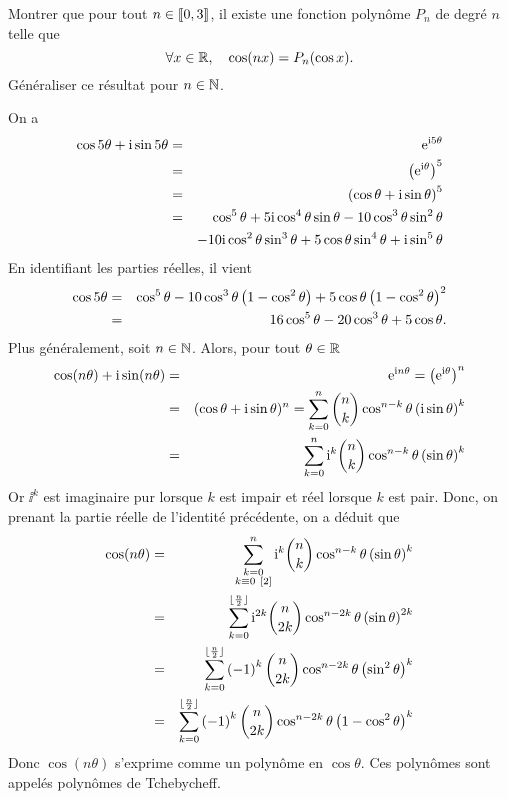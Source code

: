 \documentclass{magnolia}
\begin{document}
\begin{exoUnique}
\exo
  \begin{questions}
  \question Montrer que pour tout $n\in\left\llbracket 0,3\right\rrbracket$, il existe une fonction
    polynôme $P_n$ de degré $n$ telle que
    \[\forall x\in\mathbb{R},\quad \cos(nx)=P_n(\cos x).\]
  \question Généraliser ce résultat pour $n\in\mathbb{N}$.
  \end{questions}
  \begin{sol}
  On a
    \begin{eqnarray*}
    \cos 5\theta+{\rm i}\sin 5\theta 
    &=& {\rm e}^{{\rm i} 5\theta}\\
    &=& \left({\rm e}^{{\rm i}\theta}\right)^5\\
    &=& \left(\cos\theta+{\rm i}\sin\theta\right)^5\\
    &=& \cos^5\theta+5{\rm i}\cos^4\theta\sin\theta-10\cos^3\theta\sin^2\theta\\
    & & -10{\rm i}\cos^2\theta\sin^3\theta+5\cos\theta\sin^4\theta+{\rm i}\sin^5\theta
    \end{eqnarray*}
    En identifiant les parties réelles, il vient
    \begin{eqnarray*}
    \cos 5\theta
    &=& \cos^5\theta-10\cos^3\theta\left(1-\cos^2\theta\right)
        +5\cos\theta\left(1-\cos^2\theta\right)^2\\
    &=& 16\cos^5\theta-20\cos^3\theta+5\cos\theta.
    \end{eqnarray*}
  Plus généralement, soit $n\in\mathbb{N}$. Alors, pour tout $\theta\in\mathbb{R}$
  \begin{eqnarray*}
  \cos(n\theta)+{\rm i}\sin(n\theta)
  &=& {\rm e}^{{\rm i} n\theta} = \left({\rm e}^{{\rm i}\theta}\right)^n\\
  &=& (\cos\theta+{\rm i}\sin\theta)^n = \sum_{k=0}^n \binom{n}{k}\cos^{n-k}\theta\left({\rm i}\sin\theta\right)^k\\
  &=& \sum_{k=0}^n {\rm i}^k\binom{n}{k}\cos^{n-k}\theta\left(\sin\theta\right)^k
  \end{eqnarray*} 
  Or $\ii^k$ est imaginaire pur lorsque $k$ est impair et réel lorsque $k$ est pair. Donc, on prenant la partie réelle de l'identité précédente, on a déduit que
  \begin{eqnarray*}
  \cos(n\theta)
  &=& \sum_{\substack{k=0\\ k\equiv 0\ [2]}}^n {\rm i}^k\binom{n}{k}\cos^{n-k}\theta\left(\sin\theta\right)^k\\
  &=& \sum_{k=0}^{\lfloor\frac{n}{2}\rfloor} {\rm i}^{2k} \binom{n}{2k}\cos^{n-2k}\theta\left(\sin\theta\right)^{2k}\\
  &=& \sum_{k=0}^{\lfloor\frac{n}{2}\rfloor} \left(-1\right)^k \binom{n}{2k}\cos^{n-2k}\theta\left(\sin^2\theta\right)^{k}\\
  &=& \sum_{k=0}^{\lfloor\frac{n}{2}\rfloor} \left(-1\right)^k \binom{n}{2k}\cos^{n-2k}\theta\left(1-\cos^2\theta\right)^{k}
  \end{eqnarray*} 
  Donc $\cos(n\theta)$ s'exprime comme un polynôme en $\cos\theta$. Ces polynômes sont appelés polynômes de Tchebycheff.
  \end{sol}
\end{exoUnique}
\end{document}
